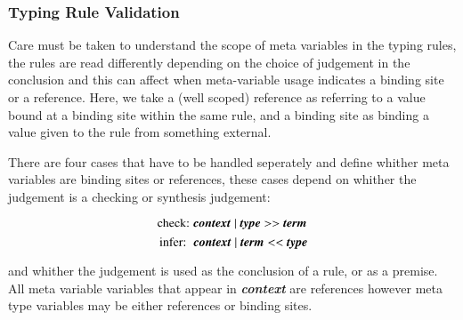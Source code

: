 \subsubsection{Typing Rule Validation}

Care must be taken to understand the scope of meta variables in the
typing rules, the rules are read differently depending on the choice
of judgement in the conclusion and this can affect when meta-variable
usage indicates a binding site or a reference. Here, we take a (well scoped)
reference as referring to a value bound at a binding site within the
same rule, and a binding site as binding a value given to the rule
from something external. 

There are four cases that have to be handled seperately and define
whither meta variables are binding sites or references, these cases
depend on whither the judgement is a checking or synthesis judgement:

$$\mbox{check: }\textbf{\emph{context}} \; \vert \; \textbf{\emph{type}}
>> \textbf{\emph{term}}$$
$$\mbox{ infer: }\;\textbf{\emph{context}} \; \vert \; \textbf{\emph{term}}
<< \textbf{\emph{type}}$$

and whither the judgement is used as the conclusion of a rule, or as a
premise. All meta variable variables that appear in 
\textbf{\emph{context}} are references however meta type variables may
be either references or binding sites.

